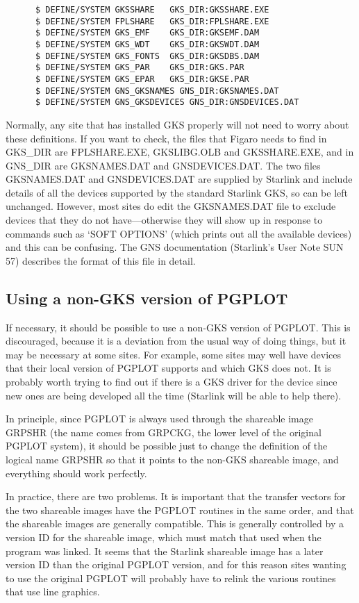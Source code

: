 \begin{verbatim}
      $ DEFINE/SYSTEM GKSSHARE   GKS_DIR:GKSSHARE.EXE
      $ DEFINE/SYSTEM FPLSHARE   GKS_DIR:FPLSHARE.EXE
      $ DEFINE/SYSTEM GKS_EMF    GKS_DIR:GKSEMF.DAM
      $ DEFINE/SYSTEM GKS_WDT    GKS_DIR:GKSWDT.DAM
      $ DEFINE/SYSTEM GKS_FONTS  GKS_DIR:GKSDBS.DAM
      $ DEFINE/SYSTEM GKS_PAR    GKS_DIR:GKS.PAR
      $ DEFINE/SYSTEM GKS_EPAR   GKS_DIR:GKSE.PAR
      $ DEFINE/SYSTEM GNS_GKSNAMES GNS_DIR:GKSNAMES.DAT
      $ DEFINE/SYSTEM GNS_GKSDEVICES GNS_DIR:GNSDEVICES.DAT
\end{verbatim}

Normally, any site that has installed GKS properly will not need to worry
about these definitions. If you want to check, the files that Figaro needs to
find in GKS\_DIR are FPLSHARE.EXE, GKSLIBG.OLB and GKSSHARE.EXE, and in
GNS\_DIR are GKSNAMES.DAT and GNSDEVICES.DAT. The two files GKSNAMES.DAT and
GNSDEVICES.DAT are supplied by Starlink and include details of all the devices
supported by the standard Starlink GKS, so can be left unchanged.  However,
most sites do edit the GKSNAMES.DAT file to exclude devices that they do not
have---otherwise they will show up in response to commands such as  `SOFT
OPTIONS' (which prints out all the available devices) and this  can be
confusing. The GNS documentation (Starlink's User Note SUN 57) describes the
format of this file in detail.

\subsection{Using a non-GKS version of PGPLOT}

If necessary, it should be possible to use a non-GKS version of PGPLOT. This is
discouraged, because it is a deviation from the usual way of doing things, but
it may be necessary at some sites.  For example, some sites may well have
devices that their local version of PGPLOT supports and which GKS does not. It
is probably worth trying to find out if there is a GKS driver for the device
since new ones are being developed all the time (Starlink will be able to help
there).

In principle, since PGPLOT is always used through the shareable image GRPSHR
(the name comes from GRPCKG, the lower level of the original PGPLOT system), it
should be possible just to change the definition of the logical name GRPSHR so
that it points to the non-GKS shareable image, and everything should work
perfectly.

In practice, there are two problems. It is important that the transfer vectors
for the two shareable images have the PGPLOT routines in the same  order, and
that the shareable images are generally compatible.  This  is generally
controlled by a version ID for the shareable image, which must match that used
when the program was linked. It seems that the  Starlink shareable image has a
later version ID than the original PGPLOT version, and for this reason sites
wanting to use the original PGPLOT will probably have to relink the various
routines that use line graphics.

